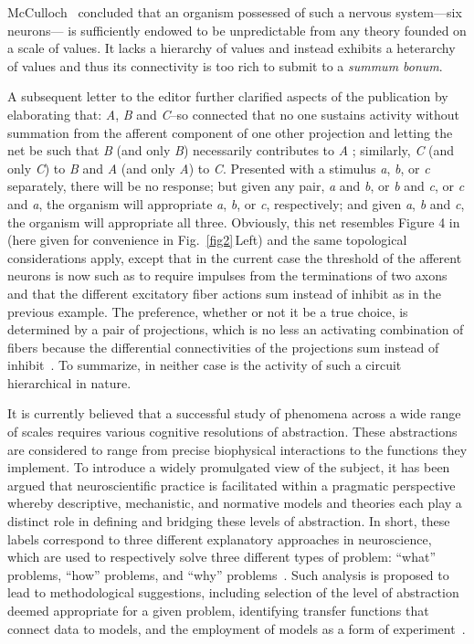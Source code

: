 \documentclass[10pt,letterpaper]{article}
\begin{document}
McCulloch~\cite{mcculloch45a} concluded that an organism possessed of such a nervous system---six neurons--- is sufficiently endowed to be unpredictable from any theory founded on a scale of values. It lacks a hierarchy of values and instead exhibits a heterarchy of values and thus its connectivity is too rich to submit to a {\it{summum bonum}}.

A subsequent letter to the editor further clarified aspects of the publication by elaborating that: {\it{A}}, {\it{B}} and {\it{C}}--so connected that no one sustains activity without summation from the afferent component of one other projection and letting the net be such that {\it{B}} (and only {\it{B}}) necessarily contributes to {\it{A}} ; similarly, {\it{C}} (and only {\it{C}}) to {\it{B}} and {\it{A}} (and only {\it{A}}) to {\it{C}}. Presented with a stimulus {\it{a}}, {\it{b}}, or {\it{c}} separately, there will be no response; but given any pair, {\it{a}} and {\it{b}}, or {\it{b}} and {\it{c}}, or {\it{c}} and {\it{a}}, the organism will appropriate {\it{a}}, {\it{b}}, or {\it{c}}, respectively; and given {\it{a}}, {\it{b}} and {\it{c}}, the organism will appropriate all three. Obviously, this net resembles Figure 4 in~\cite{mcculloch45a} (here given for convenience in Fig.~\ref{fig2}\,Left) and the same topological considerations apply, except that in the current case the threshold of the afferent neurons is now such as to require impulses from the terminations of two axons and that the different excitatory fiber actions sum instead of inhibit as in the previous example. The preference, whether or not it be a true choice, is determined by a pair of projections, which is no less an activating combination of fibers because the differential connectivities of the projections sum instead of inhibit~\cite{mcculloch45b}. To summarize, in neither case is the activity of such a circuit hierarchical in nature.

It is currently believed that a successful study of phenomena across a wide range of scales requires various cognitive resolutions of abstraction. These abstractions are considered to range from precise biophysical interactions to the functions they implement. To introduce a widely promulgated view of the subject, it has been argued that neuroscientific practice is facilitated within a pragmatic perspective whereby descriptive, mechanistic, and normative models and theories each play a distinct role in defining and bridging these levels of abstraction. In short, these labels correspond to three different explanatory approaches in neuroscience, which are used to respectively solve three different types of problem: “what” problems, “how” problems, and “why” problems~\cite{dayan01}. Such analysis is proposed to lead to methodological suggestions, including selection of the level of abstraction deemed appropriate for a given problem, identifying transfer functions that connect data to models, and the employment of models as a form of experiment~\cite{levenstein23}.
\end{document}
